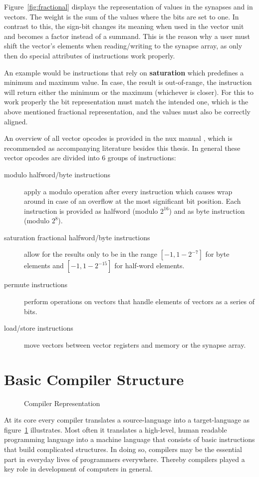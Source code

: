 {Figure~\ref{fig:fractional} displays the representation of values in the synapses and in vectors.
The weight is the sum of the values where the bits are set to one.
In contrast to this, the sign-bit changes its meaning when used in the vector unit and becomes a factor instead of a summand.
This is the reason why a user must shift the vector's elements when reading/writing to the synapse array, as only then do special attributes of instructions work properly.

An example would be instructions that rely on \textbf{saturation} which predefines a minimum and maximum value.
In case, the result is out-of-range, the instruction will return either the minimum or the maximum (whichever is closer).
For this to work properly the bit representation must match the intended one, which is the above mentioned fractional representation, and the values must also be correctly aligned.

An overview of all vector opcodes is provided in the nux manual \cite[ch.~5]{nuxmanual}, which is recommended as accompanying literature besides this thesis.
In general these vector opcodes are divided into 6 groups of instructions:
\begin{description}
    \item[modulo halfword/byte instructions] apply a modulo operation after every instruction which causes wrap around in case of an overflow at the most significant bit position.
        Each instruction is provided as halfword (modulo $2^{16}$) and as byte instruction (modulo $2^{8}$).
    \item[saturation fractional halfword/byte instructions] allow for the results only to be in the range $[-1, 1-2^{-7}]$ for byte elements and $[-1, 1-2^{-15}]$ for half-word elements.
    \item[permute instructions] perform operations on vectors that handle elements of vectors as a series of bits.
    \item[load/store instructions] move vectors between vector registers and memory or the synapse array.
\end{description}


\section{Basic Compiler Structure}
\label{section:compiler}

\begin{figure}
\captionsetup{format=plain, indention=.6cm, labelsep=newline,singlelinecheck=false}
    \centering
        
        \caption{\label{fig:compiler} Compiler Representation}
\end{figure}
At its core every compiler translates a source-language into a target-language as figure~\ref{fig:compiler} illustrates.
Most often it translates a high-level, human readable programming language into a machine language that consists of basic instructions that build complicated structures.
In doing so, compilers may be the essential part in everyday lives of programmers everywhere.
Thereby compilers played a key role in development of computers in general.

}
